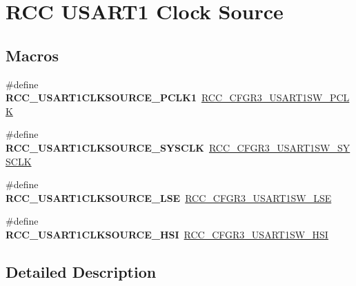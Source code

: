 \hypertarget{group___r_c_c___u_s_a_r_t1___clock___source}{}\section{R\+CC U\+S\+A\+R\+T1 Clock Source}
\label{group___r_c_c___u_s_a_r_t1___clock___source}
\subsection*{Macros}
\begin{DoxyCompactItemize}
\item 
\mbox{\label{group___r_c_c___u_s_a_r_t1___clock___source_ga577d17f0ddb77fa4416338cd4d1891b5}} 
\#define {\bfseries R\+C\+C\+\_\+\+U\+S\+A\+R\+T1\+C\+L\+K\+S\+O\+U\+R\+C\+E\+\_\+\+P\+C\+L\+K1}~\hyperlink{group___peripheral___registers___bits___definition_ga5468e5cf3a5f069717e7dfb4b3811c08}{R\+C\+C\+\_\+\+C\+F\+G\+R3\+\_\+\+U\+S\+A\+R\+T1\+S\+W\+\_\+\+P\+C\+LK}
\item 
\mbox{\label{group___r_c_c___u_s_a_r_t1___clock___source_ga50441be9ccc8a7abbdba23cfd7f7286c}} 
\#define {\bfseries R\+C\+C\+\_\+\+U\+S\+A\+R\+T1\+C\+L\+K\+S\+O\+U\+R\+C\+E\+\_\+\+S\+Y\+S\+C\+LK}~\hyperlink{group___peripheral___registers___bits___definition_ga4df150a834b1d29c3ea9497c02518aa2}{R\+C\+C\+\_\+\+C\+F\+G\+R3\+\_\+\+U\+S\+A\+R\+T1\+S\+W\+\_\+\+S\+Y\+S\+C\+LK}
\item 
\mbox{\label{group___r_c_c___u_s_a_r_t1___clock___source_gac2e82299a4295d0e5bf42950f99ddb39}} 
\#define {\bfseries R\+C\+C\+\_\+\+U\+S\+A\+R\+T1\+C\+L\+K\+S\+O\+U\+R\+C\+E\+\_\+\+L\+SE}~\hyperlink{group___peripheral___registers___bits___definition_ga1ab80ddbf35c3372ce39ae60f7b10c2e}{R\+C\+C\+\_\+\+C\+F\+G\+R3\+\_\+\+U\+S\+A\+R\+T1\+S\+W\+\_\+\+L\+SE}
\item 
\mbox{\label{group___r_c_c___u_s_a_r_t1___clock___source_ga15818f4637d9721117cf6751ad79af28}} 
\#define {\bfseries R\+C\+C\+\_\+\+U\+S\+A\+R\+T1\+C\+L\+K\+S\+O\+U\+R\+C\+E\+\_\+\+H\+SI}~\hyperlink{group___peripheral___registers___bits___definition_ga39f135c5df8435a0b04cb5d0895de7f0}{R\+C\+C\+\_\+\+C\+F\+G\+R3\+\_\+\+U\+S\+A\+R\+T1\+S\+W\+\_\+\+H\+SI}
\end{DoxyCompactItemize}


\subsection{Detailed Description}
